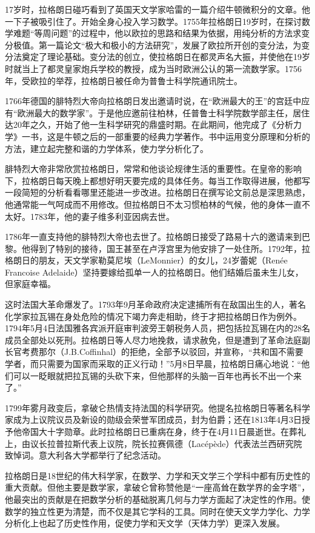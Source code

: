 \documentclass[b5paper]{ctexart}
\begin{document}
17岁时，拉格朗日碰巧看到了英国天文学家哈雷的一篇介绍牛顿微积分的文章。他一下子被吸引住了。开始全身心投入学习数学。1755年拉格朗日19岁时，在探讨数学难题“等周问题”的过程中，他以欧拉的思路和结果为依据，用纯分析的方法求变分极值。第一篇论文“极大和极小的方法研究”，发展了欧拉所开创的变分法，为变分法奠定了理论基础。变分法的创立，使拉格朗日在都灵声名大振，并使他在19岁时就当上了都灵皇家炮兵学校的教授，成为当时欧洲公认的第一流数学家。1756年，受欧拉的举荐，拉格朗日被任命为普鲁士科学院通讯院士。

1766年德国的腓特烈大帝向拉格朗日发出邀请时说，在“欧洲最大的王”的宫廷中应有“欧洲最大的数学家”。于是他应邀前往柏林，任普鲁士科学院数学部主任，居住达20年之久，开始了他一生科学研究的鼎盛时期。在此期间，他完成了《分析力学》一书，这是牛顿之后的一部重要的经典力学著作。书中运用变分原理和分析的方法，建立起完整和谐的力学体系，使力学分析化了。

腓特烈大帝非常欣赏拉格朗日，常常和他谈论规律生活的重要性。在皇帝的影响下，拉格朗日每天晚上都想好明天要完成的具体任务。每当工作取得进展，他都写一段简短的分析看看哪里还能进一步改进。拉格朗日在撰写论文前总是深思熟虑，他通常能一气呵成而不用修改。但拉格朗日不太习惯柏林的气候，他的身体一直不太好。1783年，他的妻子维多利亚因病去世。

1786年一直支持他的腓特烈大帝也去世了。拉格朗日接受了路易十六的邀请来到巴黎。他得到了特别的接待，国王甚至在卢浮宫里为他安排了一处住所。1792年，拉格朗日的朋友，天文学家勒莫尼埃（LeMonnier）的女儿，24岁蕾妮（Renée Francoise Adelaide）坚持要嫁给孤单一人的拉格朗日。他们结婚后虽未生儿女，但家庭幸福。

这时法国大革命爆发了。1793年9月革命政府决定逮捕所有在敌国出生的人，著名化学家拉瓦锡在身处危险的情况下竭力奔走相助，终于才把拉格朗日作为例外。1794年5月4日法国雅各宾派开庭审判波旁王朝税务人员，把包括拉瓦锡在内的28名成员全部处以死刑。拉格朗日等人尽力地挽救，请求赦免，但是遭到了革命法庭副长官考费那尔（J.B.Coffinhal）的拒绝，全部予以驳回，并宣称，“共和国不需要学者，而只需要为国家而采取的正义行动！”5月8日早晨，拉格朗日痛心地说：“他们可以一眨眼就把拉瓦锡的头砍下来，但他那样的头脑一百年也再长不出一个来了。”\cite{Wiki-Lagrange}

1799年雾月政变后，拿破仑热情支持法国的科学研究。他提名拉格朗日等著名科学家成为上议院议员及新设的勋级会荣誉军团成员，封为伯爵；还在1813年4月3日授予他帝国大十字勋章。此时拉格朗日已重病在身，终于在4月11日晨逝世。在葬礼上，由议长拉普拉斯代表上议院，院长拉赛佩德（Lacépède）代表法兰西研究院致悼词。意大利各大学都举行了纪念活动。

拉格朗日是18世纪的伟大科学家，在数学、力学和天文学三个学科中都有历史性的重大贡献。但他主要是数学家，拿破仑曾称赞他是“一座高耸在数学界的金字塔”，他最突出的贡献是在把数学分析的基础脱离几何与力学方面起了决定性的作用。使数学的独立性更为清楚，而不仅是其它学科的工具。同时在使天文学力学化、力学分析化上也起了历史性作用，促使力学和天文学（天体力学）更深入发展。
\end{document}
